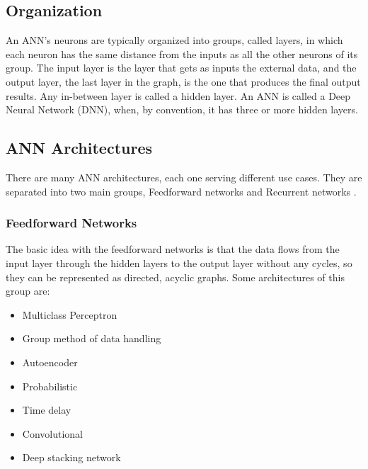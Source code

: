 \subsection{Organization}
An ANN's neurons are typically organized into groups, called layers, in which each neuron has the same distance from the inputs as all the other neurons of its group. The input layer is the layer that gets as inputs the external data, and the output layer, the last layer in the graph, is the one that produces the final output results. Any in-between layer is called a hidden layer. An ANN is called a Deep Neural Network (DNN), when, by convention, it has three or more hidden layers.

\subsection{ANN Architectures}
There are many ANN architectures, each one serving different use cases. They are separated into two main groups, Feedforward networks and Recurrent networks \cite{Types-of-Artificial-Neural-Networks}.

\subsubsection{Feedforward Networks}
The basic idea with the feedforward networks is that the data flows from the input layer through the hidden layers to the output layer without any cycles, so they can be represented as directed, acyclic graphs. Some architectures of this group are:
\begin{itemize}
	\item Multiclass Perceptron
	\item Group method of data handling
	\item Autoencoder
	\item Probabilistic
	\item Time delay
	\item Convolutional
	\item Deep stacking network
\end{itemize}

